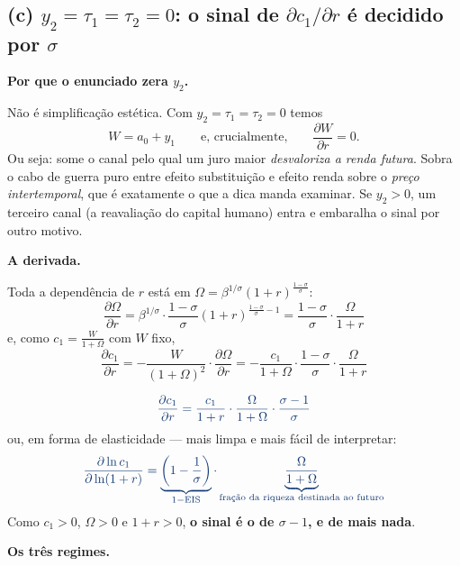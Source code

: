 \documentclass[11pt, a4paper]{article}
\newcommand{\passo}[1]{\medskip\noindent\textbf{#1}\par\nobreak}
\newcommand{\resp}[1]{%
  \ifmmode {\color{darkblue}#1}\else\textcolor{darkblue}{\textbf{#1}}\fi}
\begin{document}
\subsection*{(c) $y_2=\tau_1=\tau_2=0$: o sinal de $\partial c_1/\partial r$ é decidido por $\sigma$}

\passo{Por que o enunciado zera $y_2$.}
Não é simplificação estética. Com $y_2=\tau_1=\tau_2=0$ temos
$$W=a_0+y_1 \qquad\text{e, crucialmente,}\qquad \frac{\partial W}{\partial r}=0 .$$
Ou seja: some o canal pelo qual um juro maior \emph{desvaloriza a renda futura}. Sobra o
cabo de guerra puro entre efeito substituição e efeito renda sobre o \emph{preço
intertemporal}, que é exatamente o que a dica manda examinar. Se $y_2>0$, um terceiro
canal (a reavaliação do capital humano) entra e embaralha o sinal por outro motivo.

\passo{A derivada.}
Toda a dependência de $r$ está em $\Omega=\beta^{1/\sigma}(1+r)^{\frac{1-\sigma}{\sigma}}$:
$$\frac{\partial\Omega}{\partial r}
=\beta^{1/\sigma}\cdot\frac{1-\sigma}{\sigma}(1+r)^{\frac{1-\sigma}{\sigma}-1}
=\frac{1-\sigma}{\sigma}\cdot\frac{\Omega}{1+r}$$
e, como $c_1=\frac{W}{1+\Omega}$ com $W$ fixo,
$$\frac{\partial c_1}{\partial r}
=-\frac{W}{(1+\Omega)^2}\cdot\frac{\partial\Omega}{\partial r}
=-\frac{c_1}{1+\Omega}\cdot\frac{1-\sigma}{\sigma}\cdot\frac{\Omega}{1+r}$$

\begin{tcolorbox}[theorybox, title={Resposta do item (c)}]
$$\resp{\frac{\partial c_1}{\partial r}
=\frac{c_1}{1+r}\cdot\frac{\Omega}{1+\Omega}\cdot\frac{\sigma-1}{\sigma}}$$
ou, em forma de elasticidade --- mais limpa e mais fácil de interpretar:
$$\resp{\frac{\partial \ln c_1}{\partial \ln (1+r)}
=\underbrace{\left(1-\frac{1}{\sigma}\right)}_{1-\text{EIS}}
\cdot\underbrace{\frac{\Omega}{1+\Omega}}_{\text{fração da riqueza destinada ao futuro}}}$$
Como $c_1>0$, $\Omega>0$ e $1+r>0$, \textbf{o sinal é o de $\sigma-1$, e de mais nada}.
\end{tcolorbox}

\passo{Os três regimes.}
\end{document}
